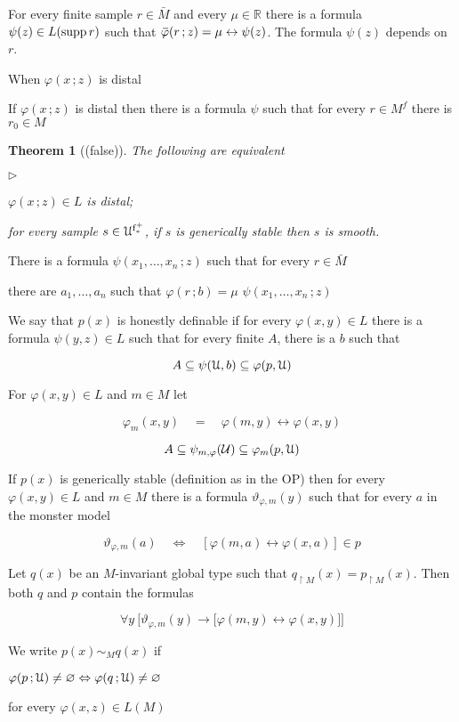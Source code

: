 \documentclass[10pt,openany]{article}
\newcommand{\mylabel}[1]{{\ssf{#1}}\hfill}
\renewenvironment{itemize}
  {\begin{list}{$\triangleright$}{%
   \setlength{\parskip}{0mm}
   \setlength{\topsep}{.4\baselineskip}
   \setlength{\rightmargin}{0mm}
   \setlength{\listparindent}{0mm}
   \setlength{\itemindent}{0mm}
   \setlength{\labelwidth}{3ex}
   \setlength{\itemsep}{.4\baselineskip}
   \setlength{\parsep}{0mm}
   \setlength{\partopsep}{0mm}
   \setlength{\labelsep}{1ex}
   \setlength{\leftmargin}{\labelwidth+\labelsep}
   \let\makelabel\mylabel}}{%
   \end{list}\vspace*{-\parskip}
  }
\def\A{\forall}
\def\RR{\mathds R}
\def\supp{\mathop{\rm supp}}
\newcommand{\sbar}[1]{\mkern 3mu\overline{\mkern-3mu#1\mkern-1mu}\mkern 1mu}
\def\IFF{\Leftrightarrow}
\def\iff{\leftrightarrow}
\def\U{\EuScript U}
\def\0{\varnothing}
\def\phi{\varphi}
\def\ssf#1{\textsf{\small #1}}
\newcounter{thm}[section]
\theoremstyle{mio}
\newtheorem{theorem}[thm]{Theorem}
\theoremstyle{liscio}
\begin{document}
For every finite sample $r\in \bar M$ and every $\mu\in\RR$ there is a formula $\psi(z)\in L(\supp r)$ such that $\sbar\phi(r\,;z)=\mu \iff \psi(z)$. The formula $\psi(z)$ depends on $r$.

When $\phi(x\,;z)$ is distal

If  $\phi(x\,;z)$ is distal then there is a formula $\psi$ such that  for every $r\in M^f$ there is $r_0\in M^{}$

\begin{theorem}[(false)]
  The following are equivalent
  \begin{itemize}
    \item[1.] $\phi(x\,;z)\in L$ is distal;
    \item[2.] for every sample $s\in\U^{\rm f^+_*}$, if $s$ is generically stable then $s$ is smooth.

  \end{itemize}
\end{theorem}

There is a formula $\psi(x_1,\dots,x_n\,;z)$ such that for every $r\in \bar M$

there are $a_1,\dots,a_n$ such that $\phi(r\,;b)=\mu$ $\psi(x_1,\dots,x_n\,;z)$


We say that $p(x)$ is honestly definable if for every $\varphi(x,y)\in L$ there is a formula $\psi(y,z)\in L$ such that for every finite $A$, there is a $b$ such that

$$A\subseteq\psi(\U,b)\subseteq \phi(p,\U)$$

For $\varphi(x,y)\in L$ and $m\in M$ let 

$$\varphi_m(x,y)\quad=\quad\varphi(m,y)\leftrightarrow\varphi(x,y)$$

$$A \subseteq\psi_{m,\phi}({\cal U})\subseteq \phi_m(p,\U)$$

If $p(x)$ is generically stable (definition as in the OP) then for every $\varphi(x,y)\in L$ and $m\in M$ there is a formula $\vartheta_{\varphi,m}(y)$ such that for every $a$ in the monster model

$$\vartheta_{\varphi,m}(a)\quad\Leftrightarrow\quad[\varphi(m,a)\leftrightarrow\varphi(x,a)]\in p$$

Let $q(x)$ be an $M$-invariant global type such that  $q_{\restriction M}(x)=p_{\restriction M}(x)$. Then both $q$ and $p$ contain the formulas

$$\A y\ \Big[\vartheta_{\varphi,m}(y)\rightarrow\big[\varphi(m,y)\leftrightarrow\varphi(x,y)\big]\Big]$$

We write $p(x)\sim_Mq(x)$ if 

$\phi(p\,;\U)\neq\0\IFF\phi(q\,;\U)\neq\0$ 

for every $\phi(x,z)\in L(M)$ 
\end{document}
